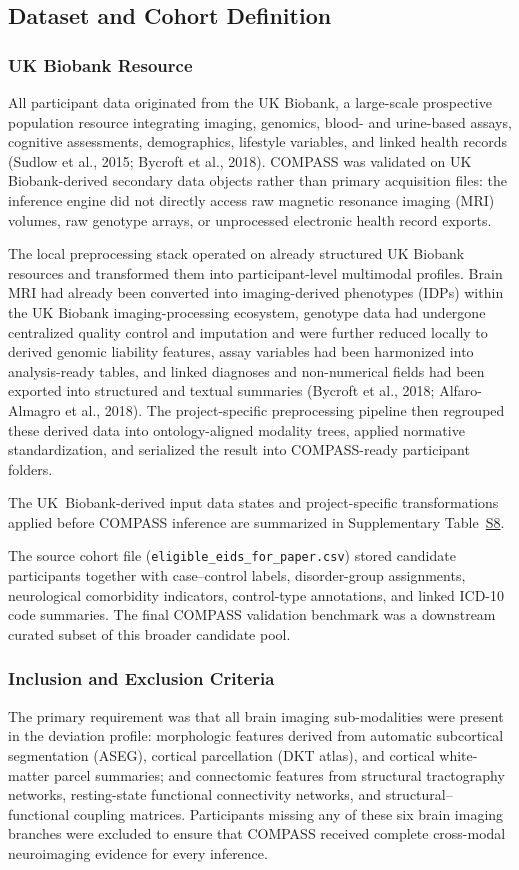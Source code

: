 \documentclass[11pt,a4paper,twoside]{article}
\begin{document}
\subsection{Dataset and Cohort Definition}
\subsubsection{UK Biobank Resource}
All participant data originated from the UK Biobank, a large-scale prospective population resource integrating imaging, genomics, blood- and urine-based assays, cognitive assessments, demographics, lifestyle variables, and linked health records (Sudlow et al., 2015; Bycroft et al., 2018). COMPASS was validated on UK Biobank-derived secondary data objects rather than primary acquisition files: the inference engine did not directly access raw magnetic resonance imaging (MRI) volumes, raw genotype arrays, or unprocessed electronic health record exports.

The local preprocessing stack operated on already structured UK Biobank resources and transformed them into participant-level multimodal profiles. Brain MRI had already been converted into imaging-derived phenotypes (IDPs) within the UK Biobank imaging-processing ecosystem, genotype data had undergone centralized quality control and imputation and were further reduced locally to derived genomic liability features, assay variables had been harmonized into analysis-ready tables, and linked diagnoses and non-numerical fields had been exported into structured and textual summaries (Bycroft et al., 2018; Alfaro-Almagro et al., 2018). The project-specific preprocessing pipeline then regrouped these derived data into ontology-aligned modality trees, applied normative standardization, and serialized the result into COMPASS-ready participant folders.


The UK~Biobank-derived input data states and project-specific transformations applied before COMPASS inference are summarized in Supplementary Table~\hyperref[tab:s8]{S8}.


The source cohort file (\texttt{eligible\_{\allowbreak}eids\_{\allowbreak}for\_{\allowbreak}paper.{\allowbreak}csv}) stored candidate participants together with case--control labels, disorder-group assignments, neurological comorbidity indicators, control-type annotations, and linked ICD-10 code summaries. The final COMPASS validation benchmark was a downstream curated subset of this broader candidate pool.

\subsubsection{Inclusion and Exclusion Criteria}
The primary requirement was that all brain imaging sub-modalities were present in the deviation profile: morphologic features derived from automatic subcortical segmentation (ASEG), cortical parcellation (DKT atlas), and cortical white-matter parcel summaries; and connectomic features from structural tractography networks, resting-state functional connectivity networks, and structural--functional coupling matrices. Participants missing any of these six brain imaging branches were excluded to ensure that COMPASS received complete cross-modal neuroimaging evidence for every inference.
\end{document}
